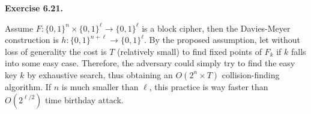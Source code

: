 \documentclass[a4paper]{article}
\newenvironment{exercise}[1]{
	\par
	\noindent\textbf{Exercise #1.}\quad
}{
	\par
	\bigskip
}
\newcommand{\bin}{\{0,1\}}
\begin{document}
\begin{exercise}{6.21}
    Assume $F:\bin^n\times\bin^\ell\to\bin^\ell$ is a block cipher, then the Davies-Meyer construction is
    $h:\bin^{n+\ell}\to\bin^\ell$.
    By the proposed assumption, let without loss of generality the cost is $T$ (relatively small) to find fixed points of $F_k$
    if $k$ falls into some easy case. 
    Therefore, the adversary could simply try to find the easy key $k$ by exhaustive search, thus obtaining an
    $O(2^n\times T)$ collision-finding algorithm. If $n$ is much smaller than $\ell$, this practice is way faster than 
    $O(2^{\ell/2})$ time birthday attack.
\end{exercise}
\end{document}
